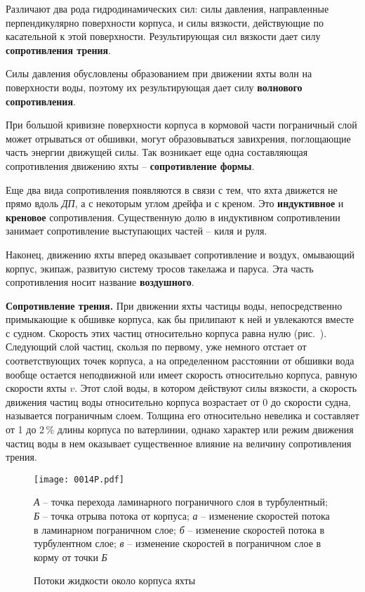 Различают два рода гидродинамических сил: силы давления, направленные перпендикулярно поверхности корпуса, и силы вязкости, действующие по касательной к этой поверхности. Результирующая сил вязкости дает силу \textbf{сопротивления трения}. 

Силы давления обусловлены образованием при движении яхты волн на поверхности воды, поэтому их результирующая дает силу \textbf{волнового сопротивления}. 

При большой кривизне поверхности корпуса в кормовой части пограничный слой может отрываться от обшивки, могут образовываться завихрения, поглощающие часть энергии движущей силы. Так возникает еще одна составляющая сопротивления движению яхты \--- \textbf{сопротивление формы}.

Еще два вида сопротивления появляются в связи с тем, что яхта движется не прямо вдоль \textit{ДП}, а с некоторым углом дрейфа и с креном. Это \textbf{индуктивное} и \textbf{креновое} сопротивления. Существенную долю в индуктивном сопротивлении занимает сопротивление выступающих частей \--- киля и руля.

Наконец, движению яхты вперед оказывает сопротивление и воздух, омывающий корпус, экипаж, развитую систему тросов такелажа и паруса. Эта часть сопротивления носит название \textbf{воздушного}. 

\textbf{Сопротивление трения.} При движении яхты частицы воды, непосредственно примыкающие к обшивке корпуса, как бы прилипают к ней и увлекаются вместе с судном. Скорость этих частиц относительно корпуса равна нулю (рис.~). Следующий слой частиц, скользя по первому, уже немного отстает от соответствующих точек корпуса, а на определенном расстоянии от обшивки вода вообще остается неподвижной или имеет скорость относительно корпуса, равную скорости яхты $v$. Этот слой воды, в котором действуют силы вязкости, а скорость движения частиц воды относительно корпуса возрастает от 0 до скорости судна, называется пограничным слоем. Толщина его относительно невелика и составляет от 1 до 2\,\% длины корпуса по ватерлинии, однако характер или режим движения частиц воды в нем оказывает существенное влияние на величину сопротивления трения.

\begin{figure*}[htb]
  \centering
  \texttt{[image: 0014P.pdf]}
  \caption{Потоки жидкости около корпуса яхты}
  \label{fig:14}
  \small
  \centering{}
  \textit{А} \--- точка перехода ламинарного пограничного слоя в турбулентный; \textit{Б} \--- точка отрыва потока от корпуса; \textit{а} \--- изменение скоростей потока в ламинарном пограничном слое; \textit{б} \--- изменение скоростей потока в турбулентном слое; \textit{в} \--- изменение скоростей в пограничном слое в корму от точки \textit{Б}
\end{figure*}

